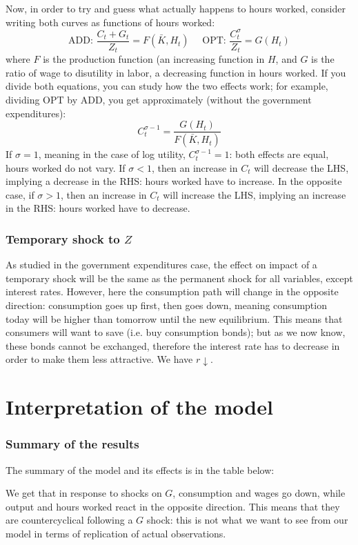 \documentclass[12pt]{report}
\begin{document}
Now, in order to try and guess what actually happens to hours worked, consider writing both curves as functions of hours worked: $$\text{ADD: } \frac{C_t + G_t}{Z_t} = F(\bar K, H_t) \quad \text{ OPT: } \frac{C_t^\sigma}{Z_t} = G(H_t) $$ where $F$ is the production function (an increasing function in $H$, and $G$ is the ratio of wage to disutility in labor, a decreasing function in hours worked. If you divide both equations, you can study how the two effects work; for example, dividing OPT by ADD, you get approximately (without the government expenditures): $$C_t^{\sigma - 1} = \frac{G(H_t)}{F(\bar K, H_t)} $$ If $\sigma = 1$, meaning in the case of log utility, $C_t^{\sigma - 1} = 1$: both effects are equal, hours worked do not vary. If $\sigma < 1$, then an increase in $C_t$ will decrease the LHS, implying a decrease in the RHS: hours worked have to increase. In the opposite case, if $\sigma > 1$, then an increase in $C_t$ will increase the LHS, implying an increase in the RHS: hours worked have to decrease.

\subsubsection{Temporary shock to $Z$}

As studied in the government expenditures case, the effect on impact of a temporary shock will be the same as the permanent shock for all variables, except interest rates. However, here the consumption path will change in the opposite direction: consumption goes up first, then goes down, meaning consumption today will be higher than tomorrow until the new equilibrium. This means that consumers will want to save (i.e. buy consumption bonds); but as we now know, these bonds cannot be exchanged, therefore the interest rate has to decrease in order to make them less attractive. We have $r\downarrow$.

\section{Interpretation of the model}

\subsubsection{Summary of the results}

The summary of the model and its effects is in the table below:



We get that in response to shocks on $G$, consumption and wages go down, while output and hours worked react in the opposite direction. This means that they are countercyclical following a $G$ shock: this is not what we want to see from our model in terms of replication of actual observations.
\end{document}
